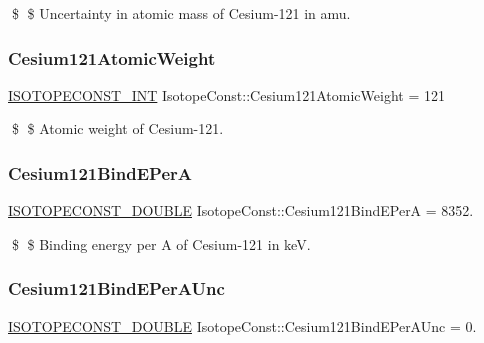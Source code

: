 \$ \$ Uncertainty in atomic mass of Cesium-\/121 in amu. \mbox{\label{group___isotope_const-_cesium-_cs121_ga2a15b526e29f1f83b665cb61ff32dacd}} 
\subsubsection{\texorpdfstring{Cesium121\+Atomic\+Weight}{Cesium121AtomicWeight}}
{\footnotesize\ttfamily \mbox{\hyperlink{group___isotope_const-_macros_ga5f18360b3e99483a35c32d789e62621c}{I\+S\+O\+T\+O\+P\+E\+C\+O\+N\+S\+T\+\_\+\+I\+NT}} Isotope\+Const\+::\+Cesium121\+Atomic\+Weight = 121}

\$ \$ Atomic weight of Cesium-\/121. \mbox{\label{group___isotope_const-_cesium-_cs121_ga389b217a088b13e91342def992ef088f}} 
\subsubsection{\texorpdfstring{Cesium121\+Bind\+E\+PerA}{Cesium121BindEPerA}}
{\footnotesize\ttfamily \mbox{\hyperlink{group___isotope_const-_macros_ga8f45a7272ce02c0b4c65c44636ed719a}{I\+S\+O\+T\+O\+P\+E\+C\+O\+N\+S\+T\+\_\+\+D\+O\+U\+B\+LE}} Isotope\+Const\+::\+Cesium121\+Bind\+E\+PerA = 8352.}

\$ \$ Binding energy per A of Cesium-\/121 in keV. \mbox{\label{group___isotope_const-_cesium-_cs121_gaafec87dffbba14b3ac98b854fdbf6c70}} 
\subsubsection{\texorpdfstring{Cesium121\+Bind\+E\+Per\+A\+Unc}{Cesium121BindEPerAUnc}}
{\footnotesize\ttfamily \mbox{\hyperlink{group___isotope_const-_macros_ga8f45a7272ce02c0b4c65c44636ed719a}{I\+S\+O\+T\+O\+P\+E\+C\+O\+N\+S\+T\+\_\+\+D\+O\+U\+B\+LE}} Isotope\+Const\+::\+Cesium121\+Bind\+E\+Per\+A\+Unc = 0.}

